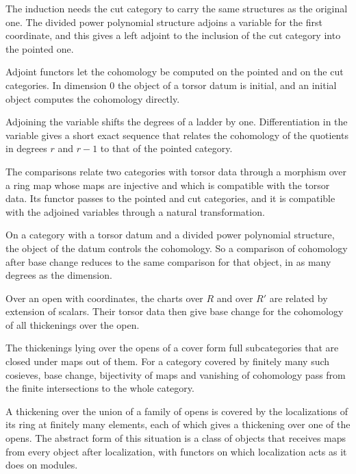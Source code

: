 The induction needs the cut category to carry the same structures as the original one. The divided power polynomial
structure adjoins a variable for the first coordinate, and this gives a left adjoint to the inclusion of the cut
category into the pointed one.

Adjoint functors let the cohomology be computed on the pointed and on the cut categories. In dimension $0$ the object of
a torsor datum is initial, and an initial object computes the cohomology directly.

Adjoining the variable shifts the degrees of a ladder by one. Differentiation in the variable gives a short exact
sequence that relates the cohomology of the quotients in degrees $r$ and $r-1$ to that of the pointed category.

The comparisons relate two categories with torsor data through a morphism over a ring map whose maps are injective and
which is compatible with the torsor data. Its functor passes to the pointed and cut categories, and it is compatible with
the adjoined variables through a natural transformation.

On a category with a torsor datum and a divided power polynomial structure, the object of the datum controls the
cohomology. So a comparison of cohomology after base change reduces to the same comparison for that object, in as many
degrees as the dimension.

Over an open with coordinates, the charts over $R$ and over $R'$ are related by extension of scalars. Their torsor data
then give base change for the cohomology of all thickenings over the open.

The thickenings lying over the opens of a cover form full subcategories that are closed under maps out of them. For a
category covered by finitely many such cosieves, base change, bijectivity of maps and vanishing of cohomology pass from
the finite intersections to the whole category.

A thickening over the union of a family of opens is covered by the localizations of its ring at finitely many elements,
each of which gives a thickening over one of the opens. The abstract form of this situation is a class of objects that
receives maps from every object after localization, with functors on which localization acts as it does on modules.

